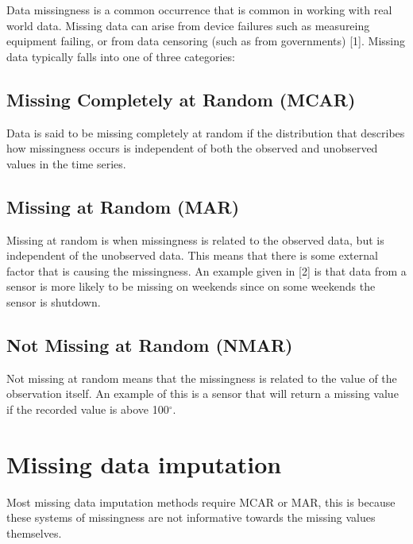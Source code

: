 \documentclass[
]{report}
\begin{document}

Data missingness is a common occurrence that is common in working with
real world data. Missing data can arise from device failures such as
measureing equipment failing, or from data censoring (such as from
governments) {[}1{]}. Missing data typically falls into one of three
categories:

\subsection{Missing Completely at Random
(MCAR)}\label{missing-completely-at-random-mcar}

Data is said to be missing completely at random if the distribution that
describes how missingness occurs is independent of both the observed and
unobserved values in the time series.

\subsection{Missing at Random (MAR)}\label{missing-at-random-mar}

Missing at random is when missingness is related to the observed data,
but is independent of the unobserved data. This means that there is some
external factor that is causing the missingness. An example given in
{[}2{]} is that data from a sensor is more likely to be missing on
weekends since on some weekends the sensor is shutdown.

\subsection{Not Missing at Random
(NMAR)}\label{not-missing-at-random-nmar}

Not missing at random means that the missingness is related to the value
of the observation itself. An example of this is a sensor that will
return a missing value if the recorded value is above 100\(^\circ\).


\section{Missing data imputation}\label{missing-data-imputation}

Most missing data imputation methods require MCAR or MAR, this is
because these systems of missingness are not informative towards the
missing values themselves. 
\end{document}
